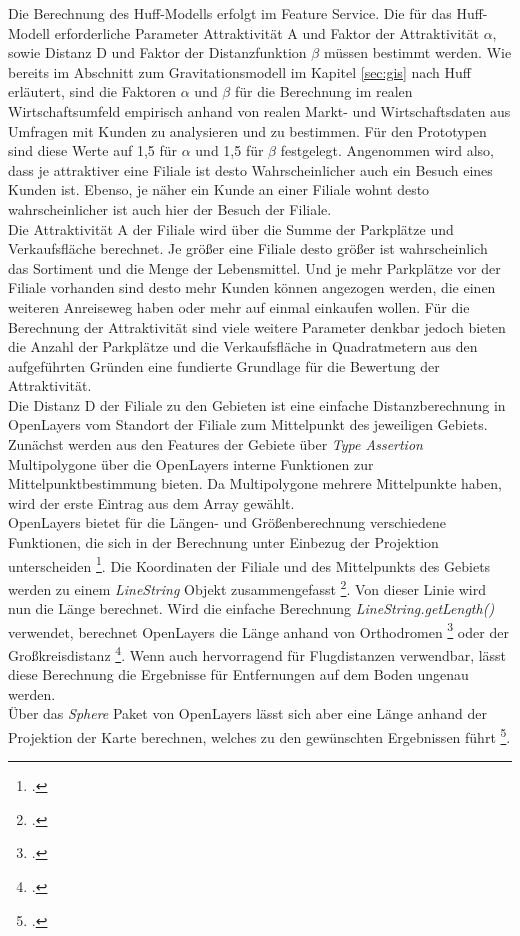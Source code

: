 Die Berechnung des Huff-Modells erfolgt im Feature Service.
Die für das Huff-Modell erforderliche Parameter Attraktivität A und Faktor der Attraktivität $\alpha$, sowie Distanz D und Faktor der Distanzfunktion $\beta$ müssen bestimmt werden.
Wie bereits im Abschnitt zum Gravitationsmodell im Kapitel \ref{sec:gis} nach Huff erläutert, sind die Faktoren $\alpha$ und $\beta$ für die Berechnung im realen Wirtschaftsumfeld empirisch anhand von realen Markt- und Wirtschaftsdaten aus Umfragen mit Kunden zu analysieren und zu bestimmen.
Für den Prototypen sind diese Werte auf 1,5 für $\alpha$ und 1,5 für $\beta$ festgelegt.
Angenommen wird also, dass je attraktiver eine Filiale ist desto Wahrscheinlicher auch ein Besuch eines Kunden ist.
Ebenso, je näher ein Kunde an einer Filiale wohnt desto wahrscheinlicher ist auch hier der Besuch der Filiale.\\
Die Attraktivität A der Filiale wird über die Summe der Parkplätze und Verkaufsfläche berechnet.
Je größer eine Filiale desto größer ist wahrscheinlich das Sortiment und die Menge der Lebensmittel.
Und je mehr Parkplätze vor der Filiale vorhanden sind desto mehr Kunden können angezogen werden, die einen weiteren Anreiseweg haben oder mehr auf einmal einkaufen wollen.
Für die Berechnung der Attraktivität sind viele weitere Parameter denkbar jedoch bieten die Anzahl der Parkplätze und die Verkaufsfläche in Quadratmetern aus den aufgeführten Gründen eine fundierte Grundlage für die Bewertung der Attraktivität.\\
Die Distanz D der Filiale zu den Gebieten ist eine einfache Distanzberechnung in OpenLayers vom Standort der Filiale zum Mittelpunkt des jeweiligen Gebiets.
Zunächst werden aus den Features der Gebiete über \emph{Type Assertion} Multipolygone über die OpenLayers interne Funktionen zur Mittelpunktbestimmung bieten.
Da Multipolygone mehrere Mittelpunkte haben, wird der erste Eintrag aus dem Array gewählt.\\
OpenLayers bietet für die Längen- und Größenberechnung verschiedene Funktionen, die sich in der Berechnung unter Einbezug der Projektion unterscheiden \footcite{openlayers_measure_example}.
Die Koordinaten der Filiale und des Mittelpunkts des Gebiets werden zu einem \emph{LineString} Objekt zusammengefasst \footcite{openlayers_linestring}.
Von dieser Linie wird nun die Länge berechnet.
Wird die einfache Berechnung \emph{LineString.getLength()} verwendet, berechnet OpenLayers die Länge anhand von Orthodromen \footcite{orthodrome_frassek} oder der Großkreisdistanz \footcite{great_circle_distance}.
Wenn auch hervorragend für Flugdistanzen verwendbar, lässt diese Berechnung die Ergebnisse für Entfernungen auf dem Boden ungenau werden.\\
Über das \emph{Sphere} Paket von OpenLayers lässt sich aber eine Länge anhand der Projektion der Karte berechnen, welches zu den gewünschten Ergebnissen führt \footcite{openlayers_sphere}.

